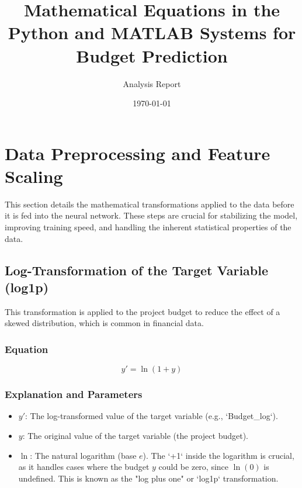 \documentclass[12pt, a4paper]{article}
\begin{document}
\title{Mathematical Equations in the Python and MATLAB Systems for Budget Prediction}
\author{Analysis Report}
\date{\today}
\maketitle
\tableofcontents
\newpage

\section{Data Preprocessing and Feature Scaling}
This section details the mathematical transformations applied to the data before it is fed into the neural network. These steps are crucial for stabilizing the model, improving training speed, and handling the inherent statistical properties of the data.

\subsection{Log-Transformation of the Target Variable (log1p)}
This transformation is applied to the project budget to reduce the effect of a skewed distribution, which is common in financial data.

\subsubsection{Equation}
\begin{equation}
y' = \ln(1 + y)
\label{eq:log1p}
\end{equation}

\subsubsection{Explanation and Parameters}
\begin{itemize}
    \item \textbf{$y'$}: The log-transformed value of the target variable (e.g., `Budget_log`).
    \item \textbf{$y$}: The original value of the target variable (the project budget).
    \item \textbf{$\ln$}: The natural logarithm (base $e$). The `+1` inside the logarithm is crucial, as it handles cases where the budget $y$ could be zero, since $\ln(0)$ is undefined. This is known as the "log plus one" or `log1p` transformation.
\end{itemize}
\end{document}
